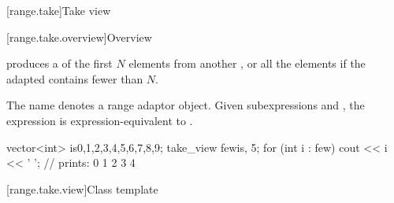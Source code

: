 [range.take]{Take view}

[range.take.overview]{Overview}

\pnum
{} produces a  of the first $N$ elements
from another , or all the elements if the adapted
 contains fewer than $N$.

\pnum
The name  denotes a
range adaptor object.
Given subexpressions  and , the expression
 is expression-equivalent to
.

\pnum
\begin{example}
\begin{codeblock}
vector<int> is{0,1,2,3,4,5,6,7,8,9};
take_view few{is, 5};
for (int i : few)
  cout << i << ' '; // prints: 0 1 2 3 4
\end{codeblock}
\end{example}

[range.take.view]{Class template }

